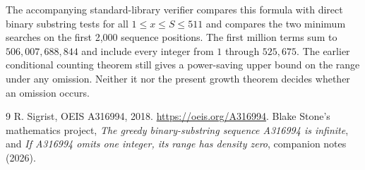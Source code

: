 \documentclass[11pt]{article}
\begin{document}
The accompanying standard-library verifier compares this formula with direct binary substring tests for all $1\le x\le S\le511$ and compares the two minimum searches on the first 2,000 sequence positions. The first million terms sum to $506{,}007{,}688{,}844$ and include every integer from $1$ through $525{,}675$. The earlier conditional counting theorem \cite{previous} still gives a power-saving upper bound on the range under any omission. Neither it nor the present growth theorem decides whether an omission occurs.
\begin{thebibliography}{9}
 R. Sigrist, OEIS A316994, 2018. \url{https://oeis.org/A316994}.
 Blake Stone's mathematics project, \emph{The greedy binary-substring sequence A316994 is infinite}, and \emph{If A316994 omits one integer, its range has density zero}, companion notes (2026).
\end{thebibliography}
\end{document}
